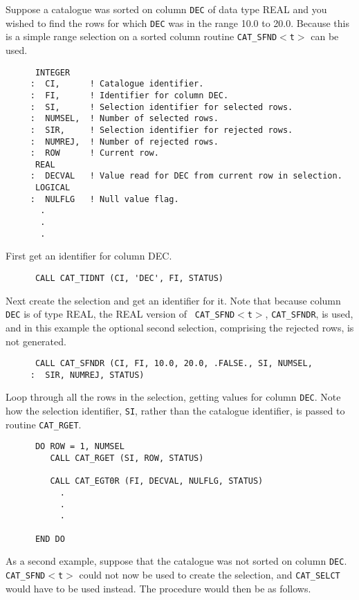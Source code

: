 Suppose a catalogue was sorted on column {\tt DEC} of data type REAL
and you wished to find the rows for which {\tt DEC} was in the range
10.0 to 20.0. Because this is a simple range selection on a sorted
column routine {\tt CAT\_SFND$<$t$>$} can be used.

\begin{verbatim}
      INTEGER
     :  CI,      ! Catalogue identifier.
     :  FI,      ! Identifier for column DEC.
     :  SI,      ! Selection identifier for selected rows.
     :  NUMSEL,  ! Number of selected rows.
     :  SIR,     ! Selection identifier for rejected rows.
     :  NUMREJ,  ! Number of rejected rows.
     :  ROW      ! Current row.
      REAL
     :  DECVAL   ! Value read for DEC from current row in selection.
      LOGICAL
     :  NULFLG   ! Null value flag.
       .
       .
       .
\end{verbatim}

First get an identifier for column DEC.

\begin{verbatim}
      CALL CAT_TIDNT (CI, 'DEC', FI, STATUS)
\end{verbatim}

Next create the selection and get an identifier for it. Note that
because column {\tt DEC} is of type REAL, the REAL version of {\tt
CAT\_SFND$<$t$>$}, {\tt CAT\_SFNDR}, is used, and in this example the
optional second selection, comprising the rejected rows, is not
generated.

\begin{verbatim}
      CALL CAT_SFNDR (CI, FI, 10.0, 20.0, .FALSE., SI, NUMSEL,
     :  SIR, NUMREJ, STATUS)
\end{verbatim}

Loop through all the rows in the selection, getting values for
column {\tt DEC}.  Note how the selection identifier, {\tt SI}, rather
than the catalogue identifier, is passed to routine {\tt CAT\_RGET}.


\begin{verbatim}
      DO ROW = 1, NUMSEL
         CALL CAT_RGET (SI, ROW, STATUS)

         CALL CAT_EGT0R (FI, DECVAL, NULFLG, STATUS)
           .
           .
           .

      END DO
\end{verbatim}

As a second example, suppose that the catalogue was not sorted on column
{\tt DEC}. {\tt CAT\_SFND$<$t$>$} could not now be used to create the
selection, and {\tt CAT\_SELCT} would have to be used instead. The
procedure would then be as follows.


